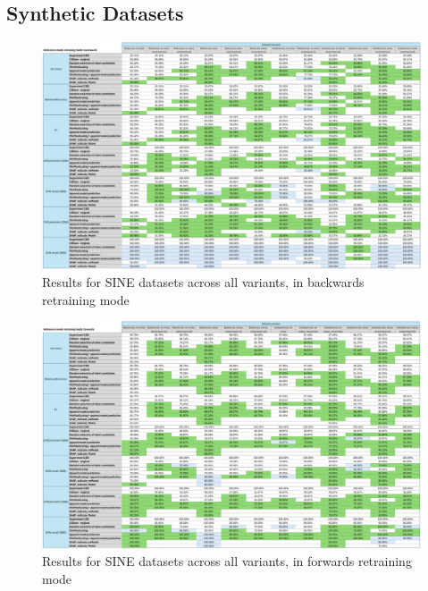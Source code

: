 \documentclass{svproc}
\begin{document}
 \subsection{Synthetic Datasets}
 \begin{figure}
 	\centering
 	\includegraphics[scale=.95]{figures/Fig24_SINE_1.png}
 	\caption{Results for SINE datasets across all variants, in backwards retraining mode}
 	\label{fig:fig24}
 \end{figure}
 
 
 \begin{figure}
 	\centering
 	\includegraphics[scale=.95]{figures/Fig25_SINE_2.png}
 	\caption{Results for SINE datasets across all variants, in forwards retraining mode}
 	\label{fig:fig25}
 \end{figure}
 
 
\end{document}
